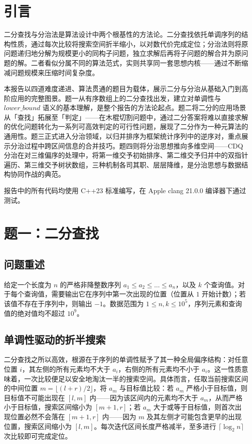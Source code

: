 \documentclass[12pt, a4paper]{academics}
\begin{document}
\makeacademicscover

\section{引言}

二分查找与分治法是算法设计中两个根基性的方法论。二分查找依托单调序列的结构性质，通过每次比较将搜索空间折半缩小，以对数代价完成定位；分治法则将原问题递归地分解为规模更小的同构子问题，独立求解后再将子问题的解合并为原问题的解。二者看似分属不同的算法范式，实则共享同一套思想内核——通过不断缩减问题规模来压缩时间复杂度。

本报告以四道难度递进、算法贯通的题目为载体，展示二分与分治从基础入门到高阶应用的完整图景。题一从有序数组上的二分查找出发，建立对单调性与 $\mathit{lower\_bound}$ 语义的基本理解，是整个报告的方法论起点。题二将二分的应用场景从「查找」拓展至「判定」——在木棍切割问题中，通过二分答案将难以直接求解的优化问题转化为一系列可高效判定的可行性问题，展现了二分作为一种元算法的通用性。题三正式进入分治领域，以归并排序为框架统计序列中的逆序对，重点展示分治过程中跨区间信息的合并技巧。题四则将分治思想推向多维空间——CDQ 分治在对三维偏序的处理中，将第一维交予初始排序、第二维交予归并中的双指针遍历、第三维交予树状数组，三种机制各司其职、层层降维，是分治思想与数据结构协同作战的典范。

报告中的所有代码均使用 C++23 标准编写，在 Apple clang 21.0.0 编译器下通过测试。

\section{题一：二分查找}

\subsection{问题重述}

给定一个长度为 $n$ 的严格非降整数序列 $a_1 \le a_2 \le \dots \le a_n$，以及 $k$ 个查询值。对于每个查询值，需要输出它在序列中第一次出现的位置（位置从 $1$ 开始计数）；若该值不存在于序列中，则输出 $-1$。数据范围为 $1 \le n, k \le 10^5$，序列元素和查询值的绝对值均不超过 $10^9$。

\subsection{单调性驱动的折半搜索}

二分查找之所以高效，根源在于序列的单调性赋予了其一种全局偏序结构：对任意位置 $i$，其左侧的所有元素均不大于 $a_i$，右侧的所有元素均不小于 $a_i$。这一性质意味着，一次比较便足以安全地淘汰一半的搜索空间。具体而言，任取当前搜索区间的中间位置 $m = \lfloor (l + r) / 2 \rfloor$，将 $a_m$ 与目标值比较：若 $a_m$ 严格小于目标值，则目标值不可能出现在 $[l, m]$ 内——因为该区间内的元素均不大于 $a_m$，从而严格小于目标值，搜索区间缩小为 $[m+1, r]$；若 $a_m$ 大于或等于目标值，则首次出现位置必然不会落在 $[m+1, r]$ 内——因为 $m$ 及其左侧才可能包含更早的出现位置，搜索区间缩小为 $[l, m]$。每次迭代区间长度严格减半，至多进行 $\lceil \log_2 n \rceil$ 次比较即可完成定位。
\end{document}
